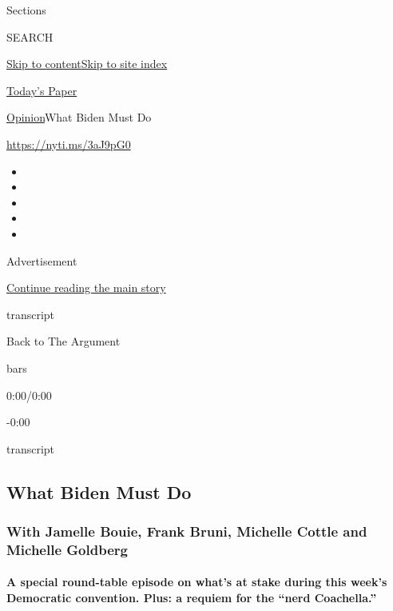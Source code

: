Sections

SEARCH

\protect\hyperlink{site-content}{Skip to
content}\protect\hyperlink{site-index}{Skip to site index}

\href{https://myaccount.nytimes3xbfgragh.onion/auth/login?response_type=cookie\&client_id=vi}{}

\href{https://www.nytimes3xbfgragh.onion/section/todayspaper}{Today's
Paper}

\href{/section/opinion}{Opinion}\textbar{}What Biden Must Do

\url{https://nyti.ms/3aJ9pG0}

\begin{itemize}
\item
\item
\item
\item
\item
\end{itemize}

Advertisement

\protect\hyperlink{after-top}{Continue reading the main story}

transcript

Back to The Argument

bars

0:00/0:00

-0:00

transcript

\hypertarget{what-biden-must-do}{%
\subsection{What Biden Must Do}\label{what-biden-must-do}}

\hypertarget{with-jamelle-bouie-frank-bruni-michelle-cottle-and-michelle-goldberg}{%
\subsubsection{With Jamelle Bouie, Frank Bruni, Michelle Cottle and
Michelle
Goldberg}\label{with-jamelle-bouie-frank-bruni-michelle-cottle-and-michelle-goldberg}}

\hypertarget{a-special-round-table-episode-on-whats-at-stake-during-this-weeks-democratic-convention-plus-a-requiem-for-the-nerd-coachella}{%
\paragraph{A special round-table episode on what's at stake during this
week's Democratic convention. Plus: a requiem for the ``nerd
Coachella.''}\label{a-special-round-table-episode-on-whats-at-stake-during-this-weeks-democratic-convention-plus-a-requiem-for-the-nerd-coachella}}

